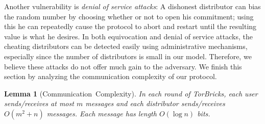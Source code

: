 \documentclass[USenglish,oneside,twocolumn]{article}
\newtheorem{lemma}{Lemma}
\newcommand{\bricks}{}
\def\bricks/{\textsf{\sfsize \mbox{TorBricks}}}
\newcommand{\sfsize}{\fontsize{0.68\baselineskip}{0.68\baselineskip}\selectfont}
\newcommand{\sans}[1]{\textsf{\sfsize \mbox{#1}}}
\begin{document}
Another vulnerability is \emph{denial of service attacks}: A dishonest distributor can bias the random number by choosing whether or not to open his commitment; using this he can repeatedly cause the protocol to abort and restart until the resulting value is what he desires. In both equivocation and denial of service attacks, the cheating distributors can be detected easily using administrative mechanisms, especially since the number of distributors is small in our model. Therefore, we believe these attacks do not offer much gain to the adversary.
We finish this section by analyzing the communication complexity of our protocol.
\begin{lemma}[\sans{Communication Complexity}]
	In each round of \bricks/, each user sends/receives at most $m$ messages and each distributor sends/receives ${O(m^2 + n)}$ messages. Each message has length $O(\log{n})$ bits.
\end{lemma}
\end{document}
